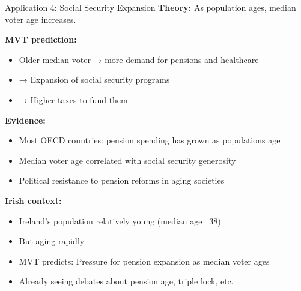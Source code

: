 \documentclass[10pt]{beamer}
\begin{document}
\begin{frame}[allowframebreaks]{Application 4: Social Security Expansion}
\textbf{Theory:} As population ages, median voter age increases.



\textbf{MVT prediction:}
\begin{itemize}
\item Older median voter → more demand for pensions and healthcare
\item → Expansion of social security programs
\item → Higher taxes to fund them
\end{itemize}



\textbf{Evidence:}
\begin{itemize}
\item Most OECD countries: pension spending has grown as populations age
\item Median voter age correlated with social security generosity
\item Political resistance to pension reforms in aging societies
\end{itemize}

\framebreak

\textbf{Irish context:}
\begin{itemize}
\item Ireland's population relatively young (median age ~38)
\item But aging rapidly
\item \alert{MVT predicts:} Pressure for pension expansion as median voter ages
\item Already seeing debates about pension age, triple lock, etc.
\end{itemize}
\end{frame}
\end{document}
